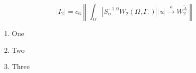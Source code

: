 \documentclass{article}
\begin{document}
\[
\lvert I_2 \rvert = 
c_6 \left\lVert 
    \int_\Omega 
        \left\lvert 
            S^{-1,0}_{\alpha, -} W_2(\Omega, \Gamma_\epsilon ) 
        \right\rvert 
\lvert u \rvert \xrightarrow{o} W^{\tilde{A}}_2
\right\rVert
\]


\begin{enumerate}[i]
  \item One
  \item Two
  \item Three
\end{enumerate}
\end{document}
